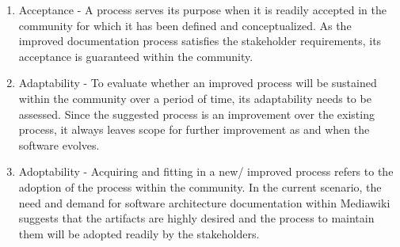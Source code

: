 \begin{itemize}
\begin{enumerate}
\item Acceptance - A process serves its purpose when it is readily accepted in the community for which it has been defined and conceptualized. As the improved documentation process satisfies the stakeholder requirements, its acceptance is guaranteed within the community. 
\item Adaptability - To evaluate whether an improved process will be sustained within the community over a period of time, its adaptability needs to be assessed. Since the suggested process is an improvement over the existing process, it always leaves scope for further improvement as and when the software evolves.
\item Adoptability - Acquiring and fitting in a new/ improved process refers to the adoption of the process within the community. In the current scenario, the need and demand for software architecture documentation within Mediawiki suggests that the artifacts are highly desired and the process to maintain them will be adopted readily by the stakeholders. 
\end{enumerate}
\end{itemize}